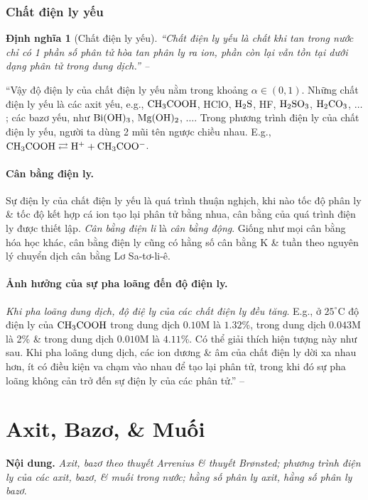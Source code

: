 \documentclass[oneside]{book}
\numberwithin{equation}{section}
\newtheorem{dinhnghia}{Định nghĩa}[section]
\begin{document}
\subsubsection{Chất điện ly yếu}

\begin{dinhnghia}[Chất điện ly yếu]
	``\emph{Chất điện ly yếu} là chất khi tan trong nước chỉ có 1 phần số phân tử hòa tan phân ly ra ion, phần còn lại vẫn tồn tại dưới dạng phân tử trong dung dịch.'' -- \cite[p. 9]{SGK_Hoa_Hoc_11_nang_cao}
\end{dinhnghia}
``Vậy độ điện ly của chất điện ly yếu nằm trong khoảng $\alpha\in(0,1)$. Những chất điện ly yếu là các axit yếu, e.g., $\rm CH_3COOH$, HClO, $\rm H_2S$, HF, $\rm H_2SO_3$, $\rm H_2CO_3$, $\ldots$; các bazơ yếu, như $\rm Bi(OH)_3$, $\rm Mg(OH)_2$, $\ldots$. Trong phương trình điện ly của chất điện ly yếu, người ta dùng 2 mũi tên ngược chiều nhau. E.g., $\rm CH_3COOH\rightleftarrows H^+ + CH_3COO^-$.

\paragraph{Cân bằng điện ly.} Sự điện ly của chất điện ly yếu là quá trình thuận nghịch, khi nào tốc độ phân ly \& tốc độ kết hợp cá ion tạo lại phân tử bằng nhua, cân bằng của quá trình điện ly được thiết lập. \textit{Cân bằng điện li} là \textit{cân bằng động}. Giống như mọi cân bằng hóa học khác, cân bằng điện ly cũng có hằng số cân bằng K \& tuần theo nguyên lý chuyển dịch cân bằng Lơ Sa-tơ-li-ê.

\paragraph{Ảnh hưởng của sự pha loãng đến độ điện ly.} \textit{Khi pha loãng dung dịch, độ điệ ly của các chất điện ly đều tăng}. E.g., ở $25^\circ$C độ điện ly của $\rm CH_3COOH$ trong dung dịch $0.10$M là $1.32$\%, trong dung dịch $0.043$M là 2\% \& trong dung dịch $0.010$M là $4.11$\%. Có thể giải thích hiện tượng này như sau. Khi pha loãng dung dịch, các ion dương \& âm của chất điện ly dời xa nhau hơn, ít có điều kiện va chạm vào nhau để tạo lại phân tử, trong khi đó sự pha loãng không cản trở đến sự điện ly của các phân tử.'' -- \cite[pp. 9--10]{SGK_Hoa_Hoc_11_nang_cao}


\section{Axit, Bazơ, \& Muối}
\textbf{Nội dung.} \textit{Axit, bazơ theo thuyết Arrenius \& thuyết Br\o nsted; phương trình điện ly của các axit, bazơ, \& muối trong nước; hằng số phân ly axit, hằng số phân ly bazơ}.
\end{document}
